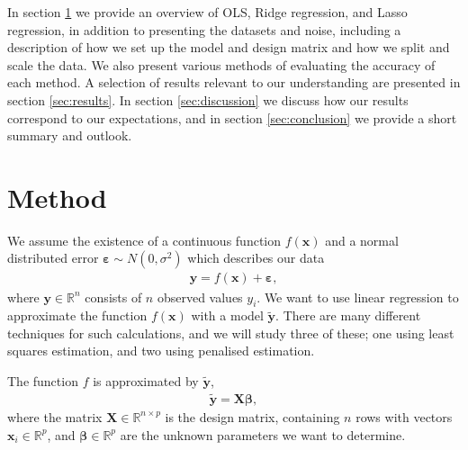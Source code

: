\documentclass[reprint,english,notitlepage]{revtex4-1}  %
\begin{document}
In section \ref{sec:methods} we provide an overview of OLS, Ridge regression, and Lasso regression, in addition to presenting the datasets and noise, including a description of how we set up the model and design matrix and how we split and scale the data. We also present various methods of evaluating the accuracy of each method. A selection of results relevant to our understanding are presented in section \ref{sec:results}. In section \ref{sec:discussion} we discuss how our results correspond to our expectations, and in section \ref{sec:conclusion} we provide a short summary and outlook. 


\section{Method}\label{sec:methods}

We assume the existence of a continuous function $f(\boldsymbol{x})$ and a normal distributed error $\boldsymbol{\varepsilon} \sim N{\left( 0, \sigma^2\right)}$ which describes our data 
\begin{align}\label{eq: model}
    \boldsymbol{y} = f(\boldsymbol{x}) + \boldsymbol{\varepsilon}, 
\end{align}
where $\boldsymbol{y}\in\mathbb{R}^n$ consists of $n$ observed values $y_i$.  
We want to use linear regression to approximate the function $f(\boldsymbol{x})$ with a model $\boldsymbol{\tilde{y}}$. 
There are many different techniques for such calculations, and we will study three of these; one using least squares estimation, and two using penalised estimation. 

The function $f$ is approximated by $\boldsymbol{\tilde{y}}$, 
\begin{align}\label{eq: y_approx}
    \boldsymbol{\tilde{y}} = \boldsymbol{X}\boldsymbol{\beta}, 
\end{align}
where the matrix $\boldsymbol{X}\in\mathbb{R}^{n\times p}$ is the design matrix, containing $n$ rows with vectors $\boldsymbol{x}_i\in\mathbb{R}^p$, and $\mathbf{\beta}\in\mathbb{R}^p$ are the unknown parameters we want to determine. 
\end{document}
